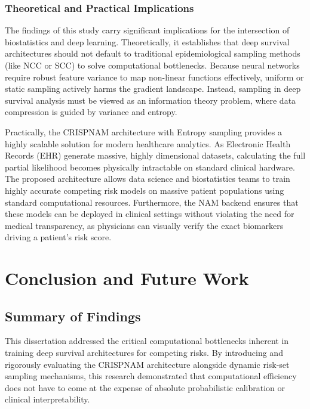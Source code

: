 \documentclass[a4paper,twoside,12pt]{report}
\begin{document}
\subsection{Theoretical and Practical Implications}

The findings of this study carry significant implications for the intersection of biostatistics and deep learning. Theoretically, it establishes that deep survival architectures should not default to traditional epidemiological sampling methods (like NCC or SCC) to solve computational bottlenecks. Because neural networks require robust feature variance to map non-linear functions effectively, uniform or static sampling actively harms the gradient landscape. Instead, sampling in deep survival analysis must be viewed as an information theory problem, where data compression is guided by variance and entropy.

Practically, the CRISPNAM architecture with Entropy sampling provides a highly scalable solution for modern healthcare analytics. As Electronic Health Records (EHR) generate massive, highly dimensional datasets, calculating the full partial likelihood becomes physically intractable on standard clinical hardware. The proposed architecture allows data science and biostatistics teams to train highly accurate competing risk models on massive patient populations using standard computational resources. Furthermore, the NAM backend ensures that these models can be deployed in clinical settings without violating the need for medical transparency, as physicians can visually verify the exact biomarkers driving a patient's risk score.


\chapter{Conclusion and Future Work}

\section{Summary of Findings}

This dissertation addressed the critical computational bottlenecks inherent in training deep survival architectures for competing risks. By introducing and rigorously evaluating the CRISPNAM architecture alongside dynamic risk-set sampling mechanisms, this research demonstrated that computational efficiency does not have to come at the expense of absolute probabilistic calibration or clinical interpretability. 
\end{document}
